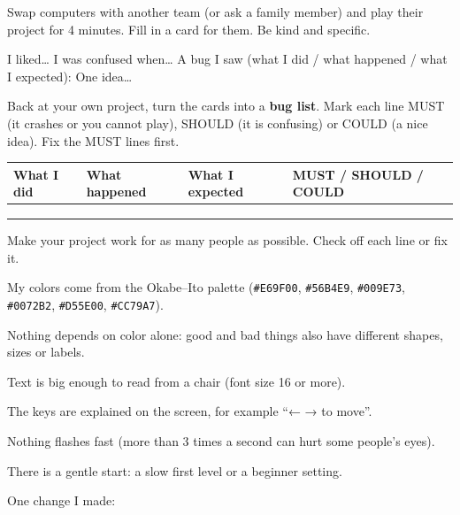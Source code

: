 \begin{exercise}
Swap computers with another team (or ask a family member) and play their project for 4 minutes.
Fill in a card for them. Be kind and specific.

\begin{tcolorbox}[colback=white,colframe=kcgreen!70!black,boxrule=0.8pt,arc=2pt,title={\small\bfseries Playtest feedback card},coltitle=black,colbacktitle=kcgreen!25]
I liked… 
I was confused when… 
A bug I saw (what I did / what happened / what I expected): 
One idea… 
\end{tcolorbox}

Back at your own project, turn the cards into a \textbf{bug list}. Mark each line MUST (it crashes or
you cannot play), SHOULD (it is confusing) or COULD (a nice idea). Fix the MUST lines first.

\renewcommand{\arraystretch}{1.6}
\begin{tabularx}{\linewidth}{|X|X|X|p{2.3cm}|}
\hline
\textbf{What I did} & \textbf{What happened} & \textbf{What I expected} & \textbf{MUST / SHOULD / COULD} \\ \hline
 & & & \\ \hline
 & & & \\ \hline
 & & & \\ \hline
\end{tabularx}
\end{exercise}

\begin{exercise}
Make your project work for as many people as possible. Check off each line or fix it.
\begin{checklist}
  \item My colors come from the Okabe--Ito palette (\texttt{\#E69F00}, \texttt{\#56B4E9}, \texttt{\#009E73}, \texttt{\#0072B2}, \texttt{\#D55E00}, \texttt{\#CC79A7}).
  \item Nothing depends on color alone: good and bad things also have different shapes, sizes or labels.
  \item Text is big enough to read from a chair (font size 16 or more).
  \item The keys are explained on the screen, for example \enquote{← → to move}.
  \item Nothing flashes fast (more than 3 times a second can hurt some people's eyes).
  \item There is a gentle start: a slow first level or a beginner setting.
\end{checklist}
One change I made: 
\end{exercise}

